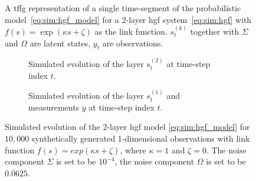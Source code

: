 \begin{figure}
  \centering
  
  \caption{A \ac{tffg} representation of a single time-segment of the probabilistic model~\eqref{eq:sim:hgf_model} for a 2-layer \ac{hgf} system~\eqref{eq:sim:hgf} with $f(s) =
      \exp(\kappa s + \zeta)$ as the link function.
    $s^{(k)}_t$ together with $\Sigma$ and $\Omega$ are latent states, $y_t$ are observations.
  }
  \label{fig:sim:hgf_one_time_segment}
\end{figure}

\begin{figure}
  \centering
  \begin{subfigure}[t]{0.475\textwidth}
    \centering
    \caption{Simulated evolution of the layer $s_t^{(2)}$ at time-step index $t$.
    }
    \label{fig:sim:hgf_example_states_1}
  \end{subfigure}
  \hfill
  \begin{subfigure}[t]{0.475\textwidth}
    \centering
    \caption{Simulated evolution of the layer $s_t^{(1)}$ and measurements $y$ at time-step index $t$.}
    \label{fig:sim:hgf_example_states_2}
  \end{subfigure}
  \caption{
    Simulated evolution of the 2-layer \ac{hgf} model \eqref{eq:sim:hgf_model} for $10,000$ synthetically generated 1-dimensional observations with link function $f(s) = exp(\kappa s + \zeta)$, where $\kappa = 1$ and $\zeta = 0$.
    The noise component $\Sigma$ is set to be $10^{-4}$, the noise component $\Omega$ is set to be
    $0.0625$.
  }
  \label{fig:sim:hgf_example_states}
\end{figure}

